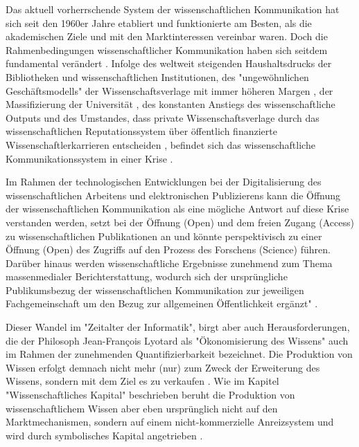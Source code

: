 Das aktuell vorherrschende System der wissenschaftlichen Kommunikation hat sich seit den 1960er Jahre etabliert und funktionierte am Besten, als die akademischen Ziele und mit den Marktinteressen vereinbar waren. Doch die Rahmenbedingungen wissenschaftlicher Kommunikation haben sich seitdem fundamental verändert \cite{epaa_Weiner_2001}. Infolge des weltweit steigenden Haushaltsdrucks der Bibliotheken und wissenschaftlichen Institutionen, des "ungewöhnlichen Geschäftsmodells" \cite{cite:12} der Wissenschaftsverlage mit immer höheren Margen \cite{albert_2006_open_implications}, der Massifizierung der Universität \cite{binswanger_2014_excellence}, des konstanten Anstiegs des wissenschaftliche Outputs \cite[:23]{haustein_2012_multidimensional} und des Umstandes, dass private Wissenschaftsverlage durch das wissenschaftlichen Reputationssystem über öffentlich finanzierte Wissenschaftlerkarrieren entscheiden \cite{heise_2012}, befindet sich das wissenschaftliche Kommunikationssystem in einer Krise \cite{cite:14}.

Im Rahmen der technologischen Entwicklungen bei der Digitalisierung des wissenschaftlichen Arbeitens und elektronischen Publizierens kann die Öffnung der wissenschaftlichen Kommunikation als eine mögliche Antwort auf diese Krise verstanden werden, setzt bei der Öffnung (Open) und dem freien Zugang (Access) zu wissenschaftlichen Publikationen an und könnte perspektivisch zu einer Öffnung (Open) des Zugriffs auf den Prozess des Forschens (Science) führen. Darüber hinaus werden wissenschaftliche Ergebnisse zunehmend zum Thema massenmedialer Berichterstattung, wodurch sich der ursprüngliche Publikumsbezug der wissenschaftlichen Kommunikation zur jeweiligen Fachgemeinschaft um den Bezug zur allgemeinen Öffentlichkeit ergänzt" \cite{bbaw_publizieren_2015} .

Dieser Wandel im "Zeitalter der Informatik", birgt aber auch Herausforderungen, die der Philosoph Jean-François Lyotard als "Ökonomisierung des Wissens" \cite{lyotard_1993_postmoderne} auch im Rahmen der zunehmenden Quantifizierbarkeit bezeichnet. Die Produktion von Wissen erfolgt demnach nicht mehr (nur) zum Zweck der Erweiterung des Wissens, sondern mit dem Ziel es zu verkaufen \cite[:156]{troy_2012_wissen}. Wie im Kapitel "Wissenschaftliches Kapital" beschrieben beruht die Produktion von wissenschaftlichem Wissen aber eben ursprünglich nicht auf den Marktmechanismen, sondern auf einem nicht-kommerzielle Anreizsystem und wird durch symbolisches Kapital angetrieben \cite[:157]{troy_2012_wissen}.

